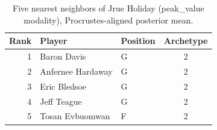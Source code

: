 \begin{table}[htbp]
  \centering\small
  \begin{tabular}{rllc}
    \toprule
    Rank & Player & Position & Archetype \\
    \midrule
    1 & Baron Davis & G & 2 \\
    2 & Anfernee Hardaway & G & 2 \\
    3 & Eric Bledsoe & G & 2 \\
    4 & Jeff Teague & G & 2 \\
    5 & Tosan Evbuomwan & F & 2 \\
    \bottomrule
  \end{tabular}
  \caption{Five nearest neighbors of Jrue Holiday (peak_value modality), Procrustes-aligned posterior mean.}
  \label{tab:Jrue_Holiday_neighbors_peak_value}
\end{table}

